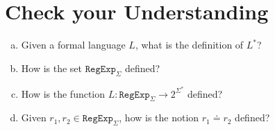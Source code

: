 \section{Check your Understanding}
\begin{enumerate}[(a)]
\item Given a formal language $L$, what is the definition of $L^*$?
\item How is the set $\mathtt{RegExp}_\Sigma$ defined?
\item How is the function $L:\mathtt{RegExp}_\Sigma \rightarrow 2^{\Sigma^*}$ defined?
\item Given $r_1, r_2 \in \mathtt{RegExp}_\Sigma$, how is the notion $r_1 \doteq r_2$ defined?
\end{enumerate}



